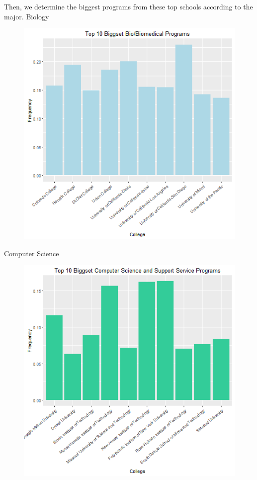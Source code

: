 \documentclass{article}
\begin{document}
Then, we determine the biggest programs from these top schools according to the major. 
Biology 
\begin{figure}[h!]
\includegraphics{../images/biggestBio.png}
\end{figure}


Computer Science
\begin{figure}[h!]
\includegraphics{../images/biggestCS.png}
\end{figure}
\end{document}
